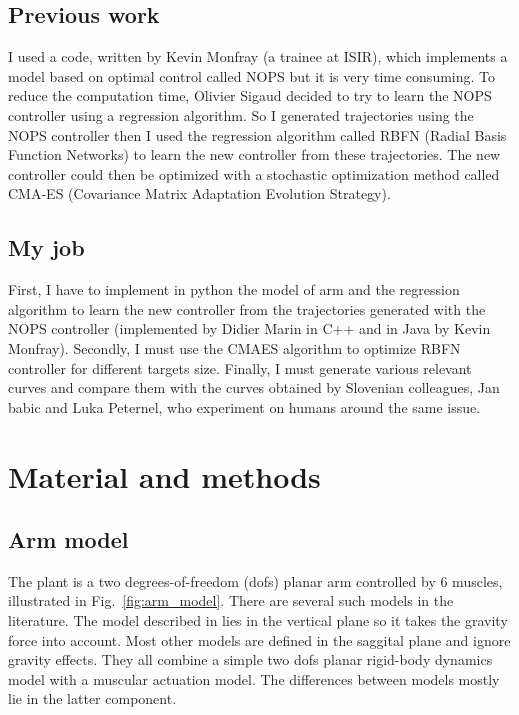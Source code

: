 \documentclass[pdftex,a4paper,12pt]{report}
\begin{document}
\section{Previous work}
I used a code, written by Kevin Monfray (a trainee at ISIR), which implements a model based on optimal control called NOPS but it is very time consuming.
To reduce the computation time, Olivier Sigaud decided to try to learn the NOPS controller using a regression algorithm.
So I generated trajectories using the NOPS controller then I used the regression algorithm called RBFN (Radial Basis Function Networks) to learn the new controller from these trajectories.
The new controller could then be optimized with a stochastic optimization method called CMA-ES (Covariance Matrix Adaptation Evolution Strategy).

\section{My job}
First, I have to implement in python the model of arm and the regression algorithm to learn the new controller from the trajectories generated with the NOPS controller (implemented by Didier Marin in C++ and in Java by Kevin Monfray).
Secondly, I must use the CMAES algorithm to optimize RBFN controller for different targets size.
Finally, I must generate various relevant curves and compare them with the curves obtained by Slovenian colleagues, Jan babic and Luka Peternel, who experiment on humans around the same issue.

\chapter{Material and methods}

\section{Arm model}
\label{sec_ArmModel}

The plant is a two degrees-of-freedom (dofs) planar arm controlled by 6 muscles, illustrated in Fig.~\ref{fig:arm_model}.
There are several such models in the literature. The model described in \cite{Kambara2009} lies in the vertical
plane so it takes the gravity force into account. Most other models are defined in the saggital plane and
ignore gravity effects. They all combine a simple two dofs planar rigid-body dynamics model with a 
muscular actuation model. The differences between models mostly lie in the latter component.
\end{document}
